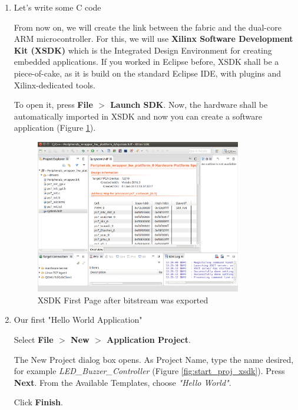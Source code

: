 \documentclass{article}
\begin{document}
\begin{enumerate}
\newpage
 \item Let's write some C code 

From now on, we will create the link between the fabric and the dual-core ARM microcontroller. For this, we will use \textbf{Xilinx Software Development Kit (XSDK)} which is the Integrated Design Environment for creating embedded applications. If you worked in Eclipse before, XSDK shall be a piece-of-cake, as it is build on the standard Eclipse IDE, with plugins and Xilinx-dedicated tools. 

To open it, press \textbf{File $>$ Launch SDK}. Now, the hardware shall be automatically imported in XSDK and now you can create a software application (Figure \ref{fig:sdk_first_page}).



 
 \begin{figure}[h!]
    \centering
    \includegraphics[width=0.85\textwidth]{img/xsdk_first_page.png}
    \caption{XSDK First Page after bitstream was exported}
    \label{fig:sdk_first_page}
\end{figure}



 \item Our first "Hello World Application"

Select \textbf{File $>$ New $>$ Application Project}.

The New Project dialog box opens. As Project Name, type the name desired, for example
\textit{LED\_Buzzer\_Controller} (Figure \ref{fig:start_proj_xsdk}). Press \textbf{Next}. From the Available Templates, choose \textit{"Hello World"}. 

Click \textbf{Finish}. 



\end{enumerate}
\end{document}
